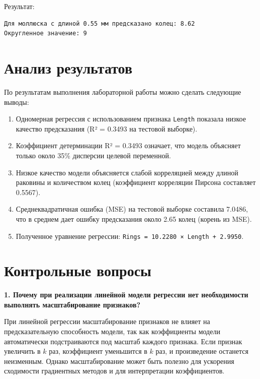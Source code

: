 Результат:

\begin{verbatim}
Для моллюска с длиной 0.55 мм предсказано колец: 8.62
Округленное значение: 9
\end{verbatim}

\section{Анализ результатов}

По результатам выполнения лабораторной работы можно сделать следующие выводы:

\begin{enumerate}
    \item Одномерная регрессия с использованием признака \texttt{Length} показала низкое качество предсказания (R² = 0.3493 на тестовой выборке).
    
    \item Коэффициент детерминации R² = 0.3493 означает, что модель объясняет только около 35\% дисперсии целевой переменной.
    
    \item Низкое качество модели объясняется слабой корреляцией между длиной раковины и количеством колец (коэффициент корреляции Пирсона составляет 0.5567).
    
    \item Среднеквадратичная ошибка (MSE) на тестовой выборке составила 7.0486, что в среднем дает ошибку предсказания около 2.65 колец (корень из MSE).
    
    \item Полученное уравнение регрессии: \texttt{Rings = 10.2280 × Length + 2.9950}.
\end{enumerate}

\section{Контрольные вопросы}

\textbf{1. Почему при реализации линейной модели регрессии нет необходимости выполнять масштабирование признаков?}

При линейной регрессии масштабирование признаков не влияет на предсказательную способность модели, так как коэффициенты модели автоматически подстраиваются под масштаб каждого признака. Если признак увеличить в $k$ раз, коэффициент уменьшится в $k$ раз, и произведение останется неизменным. Однако масштабирование может быть полезно для ускорения сходимости градиентных методов и для интерпретации коэффициентов.

